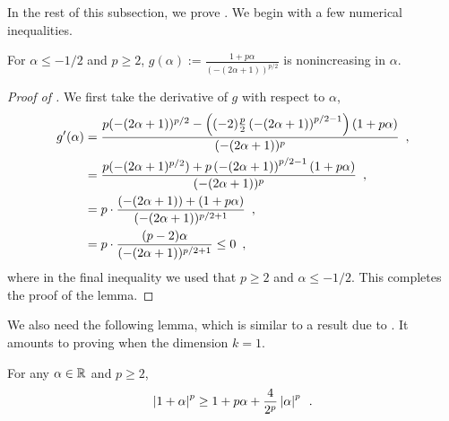 In the rest of this subsection, we prove . We begin with a few numerical inequalities. 

\begin{lemma}
\label{lemma:gp_sc_galpha}
For $\alpha \le -1/2$ and $p\ge 2$, $g(\alpha) := \frac{1+p\alpha}{(-(2\alpha+1))^{p/2}}$ is nonincreasing in $\alpha$.
\end{lemma}
\begin{proof}[Proof of ]
We first take the derivative of $g$ with respect to $\alpha$,
\begin{align*}
    g'(\alpha) &= \frac{p(-(2\alpha+1))^{p/2} - \left((-2)\frac{p}{2}\left(-(2\alpha+1)\right)^{p/2-1}\right)(1+p\alpha)}{(-(2\alpha+1))^p}\enspace,\\
    &= \frac{p(-(2\alpha+1)^{p/2}) + p\left(-(2\alpha+1)\right)^{p/2-1}(1+p\alpha)}{(-(2\alpha+1))^p}\enspace,\\
    &= p\cdot\frac{(-(2\alpha+1)) + (1+p\alpha)}{(-(2\alpha+1))^{p/2+1}}\enspace,\\
    &= p\cdot\frac{(p-2)\alpha}{(-(2\alpha+1))^{p/2+1}} \le 0\enspace,
\end{align*}
where in the final inequality we used that $p\geq 2$ and $\alpha\leq -1/2$. This completes the proof of the lemma.
\end{proof}
We also need the following lemma, which is similar to a result due to \citeauthor{akps19} \cite[Lemma 4.5]{akps19}. It amounts to proving  when the dimension $k=1$.
\begin{lemma}\label{lemma:adil_sc_lemma}
For any $\alpha\in\mathbb{R}$ and $p \ge 2$,
\begin{align*}
    \left\lvert 1+\alpha \right\rvert^p \ge 1+p\alpha+\frac{4}{2^p}\left\lvert \alpha \right\rvert^p\enspace.
\end{align*}
\end{lemma}
